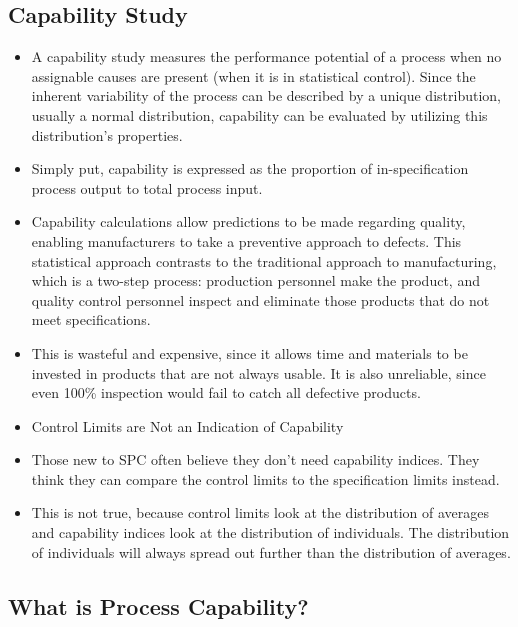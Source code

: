 \documentclass[SPC-MASTER.tex]{subfiles}
\begin{document}
\subsection{Capability Study} 
\large
\begin{itemize}
\item A capability study measures the performance potential of a process when no assignable causes are present (when it is in statistical control). Since the inherent variability of the process can be described by a unique distribution, usually a normal distribution, capability can be evaluated by utilizing this distribution’s properties. 
\item Simply put, capability is expressed as the proportion of in-specification process output to total process input.

\item Capability calculations allow predictions to be made regarding quality, enabling manufacturers to take a preventive approach to defects. This statistical approach contrasts to the traditional approach to manufacturing, which is a two-step process: production personnel make the product, and quality control personnel inspect and eliminate those products that do not meet specifications. \item This is wasteful and expensive, since it allows time and materials to be invested in products that are not always usable. It is also unreliable, since even 100\% inspection would fail to catch all defective products.
\end{itemize}

\begin{itemize}
\item Control Limits are Not an Indication of Capability

\item Those new to SPC often believe they don’t need capability indices. They think they can compare the control limits to the specification limits instead. 
\item This is not true, because control limits look at the distribution of averages and capability indices look at the distribution of individuals. The distribution of individuals will always spread out further than the distribution of averages. 
\end{itemize}

\subsection{What is Process Capability?}
\end{document}
